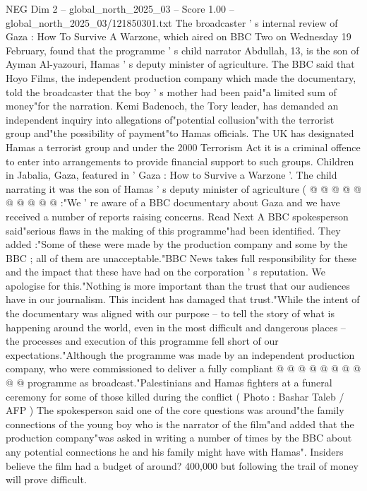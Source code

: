 \begin{textsample}{NEG Dim 2 – global\_north\_2025\_03 – Score 1.00 – global\_north\_2025\_03/121850301.txt}  \label{ex:f2_neg_040}
The broadcaster ' s internal review of Gaza : How To Survive A Warzone, which aired on BBC Two on Wednesday 19 February, found that the programme ' s child narrator Abdullah, 13, is the son of Ayman Al-yazouri, Hamas ' s deputy minister of agriculture.
The BBC said that Hoyo Films, the independent production company which made the documentary, told the broadcaster that the boy ' s mother had been paid"a limited sum of money"for the narration.
Kemi Badenoch, the Tory leader, has demanded an independent inquiry into allegations of"potential collusion"with the terrorist group and"the possibility of payment"to Hamas officials.
The UK has designated Hamas a terrorist group and under the 2000 Terrorism Act it is a criminal offence to enter into arrangements to provide financial support to such groups.
Children in Jabalia, Gaza, featured in ' Gaza : How to Survive a Warzone '.
The child narrating it was the son of Hamas ' s deputy minister of agriculture ( @ @ @ @ @ @ @ @ @ @ :"We ' re aware of a BBC documentary about Gaza and we have received a number of reports raising concerns.
Read Next A BBC spokesperson said"serious flaws in the making of this programme"had been identified.
They added :"Some of these were made by the production company and some by the BBC ; all of them are unacceptable."BBC News takes full responsibility for these and the impact that these have had on the corporation ' s reputation.
We apologise for this."Nothing is more important than the trust that our audiences have in our journalism.
This incident has damaged that trust."While the intent of the documentary was aligned with our purpose -- to tell the story of what is happening around the world, even in the most difficult and dangerous places -- the processes and execution of this programme fell short of our expectations."Although the programme was made by an independent production company, who were commissioned to deliver a fully compliant @ @ @ @ @ @ @ @ @ @ programme as broadcast."Palestinians and Hamas fighters at a funeral ceremony for some of those killed during the conflict ( Photo : Bashar Taleb / AFP ) The spokesperson said one of the core questions was around"the family connections of the young boy who is the narrator of the film"and added that the production company"was asked in writing a number of times by the BBC about any potential connections he and his family might have with Hamas".
Insiders believe the film had a budget of around? 400,000 but following the trail of money will prove difficult.

\end{textsample}
